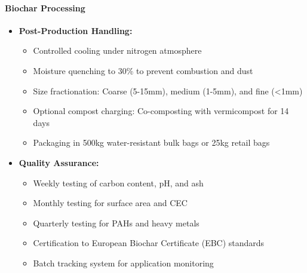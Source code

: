 \paragraph{Biochar Processing}
\begin{itemize}
    \item \textbf{Post-Production Handling:}
    \begin{itemize}
        \item Controlled cooling under nitrogen atmosphere
        \item Moisture quenching to 30\% to prevent combustion and dust
        \item Size fractionation: Coarse (5-15mm), medium (1-5mm), and fine (<1mm)
        \item Optional compost charging: Co-composting with vermicompost for 14 days
        \item Packaging in 500kg water-resistant bulk bags or 25kg retail bags
    \end{itemize}
    
    \item \textbf{Quality Assurance:}
    \begin{itemize}
        \item Weekly testing of carbon content, pH, and ash
        \item Monthly testing for surface area and CEC
        \item Quarterly testing for PAHs and heavy metals
        \item Certification to European Biochar Certificate (EBC) standards
        \item Batch tracking system for application monitoring
    \end{itemize}
\end{itemize}

